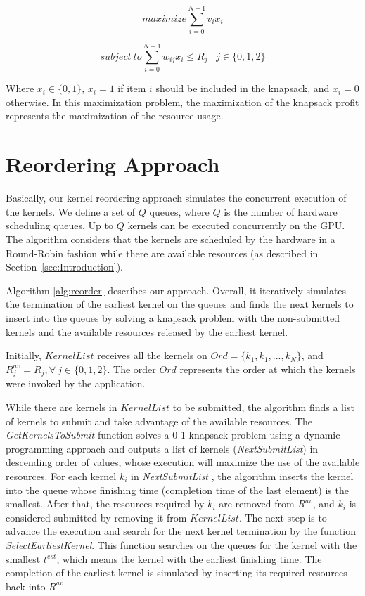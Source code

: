 \documentclass[conference]{IEEEtran}
\begin{document}
\begin{equation}
    maximize \sum_{i=0}^{N-1} v_ix_i
\end{equation}

\begin{equation}
    subject \ to \sum_{i=0}^{N-1} w_{ij}x_i \leq R_j \mid j \in \{0, 1, 2\}
\end{equation}

Where $x_i \in \{0,1\}$, $x_i = 1$ if item $i$ should be included in the knapsack, and $x_i = 0$ otherwise. In this maximization problem, the maximization of the knapsack profit represents the maximization of the resource usage.


\section{Reordering Approach}

Basically, our kernel reordering approach simulates the concurrent execution of the kernels. We define a set of $Q$ queues, where $Q$ is the number of hardware scheduling queues. Up to $Q$ kernels can be executed concurrently on the GPU. The algorithm considers that the kernels are scheduled by the hardware in a Round-Robin fashion while there are available resources (as described in Section~\ref{sec:Introduction}). 

Algorithm \ref{alg:reorder} describes our approach. Overall, it iteratively simulates the termination of the earliest kernel on the queues and finds the next kernels to insert into the queues by solving a knapsack problem with the non-submitted kernels and the available resources released by the earliest kernel. 

Initially, $KernelList$ receives all the kernels on $Ord=\{k_1, k_1, ..., k_N\}$, and $R_{j}^{av}=R_{j}, \forall ~j \in \{0,1,2\}$. The order $Ord$ represents the order at which the kernels were invoked by the application. 

While there are kernels in $KernelList$ to be submitted, the algorithm finds a list of kernels to submit and take advantage of the available resources. The \textit{GetKernelsToSubmit} function solves a 0-1 knapsack problem using a dynamic programming approach and outputs a list of kernels (\textit{NextSubmitList}) in descending order of values, whose execution will maximize the use of the available resources.
For each  kernel $k_i$ in \textit{NextSubmitList} , the algorithm inserts the kernel into the queue whose finishing time (completion time of the last element) is the smallest. After that, the resources required by $k_i$ are removed from $R^{av}$, and $k_i$ is considered submitted by removing it from $KernelList$. 
The next step is to advance the execution and search for the next kernel termination by the function \textit{SelectEarliestKernel}. This function searches on the queues for the kernel with the smallest $t^{est}$, which means the kernel with the earliest finishing time. The completion of the earliest kernel is simulated by inserting its required resources back into $R^{av}$.  
\end{document}
